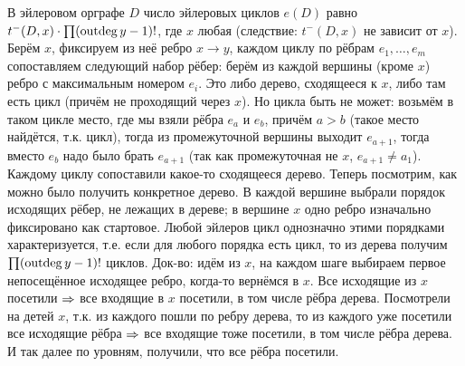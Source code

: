 В эйлеровом орграфе $D$ число эйлеровых циклов $e(D)$ равно $t^-(D, x)\cdot\prod(\operatorname{outdeg} y-1)!$, где $x$ любая
(следствие: $t^-(D, x)$ не зависит от $x$).
Берём $x$, фиксируем из неё ребро $x\to y$, каждом циклу по рёбрам $e_1, \dots, e_m$ сопоставляем следующий набор рёбер:
берём из каждой вершины (кроме $x$) ребро с максимальным номером $e_i$.
Это либо дерево, сходящееся к $x$, либо там есть цикл (причём не проходящий через $x$).
Но цикла быть не может: возьмём в таком цикле место, где мы взяли рёбра $e_a$ и $e_b$, причём
$a>b$ (такое место найдётся, т.к. цикл), тогда из промежуточной вершины выходит $e_{a+1}$,
тогда вместо $e_b$ надо было брать $e_{a+1}$ (так как промежуточная не $x$, $e_{a+1}\neq a_1$).
Каждому циклу сопоставили какое-то сходящееся дерево.
Теперь посмотрим, как можно было получить конкретное дерево.
В каждой вершине выбрали порядок исходящих рёбер, не лежащих в дереве;
в вершине $x$ одно ребро изначально фиксировано как стартовое.
Любой эйлеров цикл однозначно этими порядками характеризуется, т.е.
если для любого порядка есть цикл, то из дерева получим $\prod(\operatorname{outdeg} y - 1)!$ циклов.
Док-во: идём из $x$, на каждом шаге выбираем первое непосещённое исходящее ребро,
когда-то вернёмся в $x$.
Все исходящие из $x$ посетили $\Rightarrow$ все входящие в $x$ посетили, в том числе
рёбра дерева.
Посмотрели на детей $x$, т.к. из каждого пошли по ребру дерева, то из каждого
уже посетили все исходящие рёбра $\Rightarrow$ все входящие тоже посетили, в том числе
рёбра дерева.
И так далее по уровням, получили, что все рёбра посетили.
